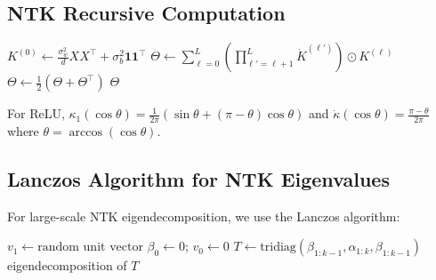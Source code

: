 \documentclass[10pt]{article}
\theoremstyle{definition}
\begin{document}
\subsection{NTK Recursive Computation}
\label{app:alg-ntk}

\begin{algorithm}[H]
\SetAlgoLined
{}
$K^{(0)} \leftarrow \frac{\sigma_w^2}{d} X X^\top + \sigma_b^2 \mathbf{1}\mathbf{1}^\top$\;
$\Theta \leftarrow \sum_{\ell=0}^{L} \left(\prod_{\ell'=\ell+1}^{L} \dot{K}^{(\ell')}\right) \odot K^{(\ell)}$\;
$\Theta \leftarrow \frac{1}{2}(\Theta + \Theta^\top)$ 
\Return $\Theta$\;
\caption{Analytical NTK for FC Networks}
\label{alg:ntk}
\end{algorithm}

For ReLU, $\kappa_1(\cos\theta) = \frac{1}{2\pi}(\sin\theta + (\pi - \theta)\cos\theta)$ and $\dot{\kappa}(\cos\theta) = \frac{\pi - \theta}{2\pi}$ where $\theta = \arccos(\cos\theta)$.

\subsection{Lanczos Algorithm for NTK Eigenvalues}
\label{app:alg-lanczos}

For large-scale NTK eigendecomposition, we use the Lanczos algorithm:

\begin{algorithm}[H]
\SetAlgoLined
{}
$v_1 \leftarrow \text{random unit vector}$\;
$\beta_0 \leftarrow 0$; $v_0 \leftarrow 0$\;
$T \leftarrow \text{tridiag}(\beta_{1:k-1}, \alpha_{1:k}, \beta_{1:k-1})$\;
\Return eigendecomposition of $T$\;
\caption{Lanczos Iteration for NTK Eigenvalues}
\label{alg:lanczos}
\end{algorithm}
\end{document}
